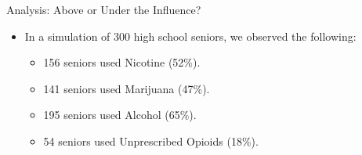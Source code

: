 \documentclass{beamer}
\begin{document}
\begin{frame}{Analysis: Above or Under the Influence?}
    \begin{itemize}
        \item In a simulation of 300 high school seniors, we observed the following:
        \begin{itemize}
            \item 156 seniors used Nicotine (52\%).
            \item 141 seniors used Marijuana (47\%). 
            \item 195 seniors used Alcohol (65\%). 
            \item 54 seniors used Unprescribed Opioids (18\%). 
        \end{itemize}
    \end{itemize}
\end{frame}
\end{document}
